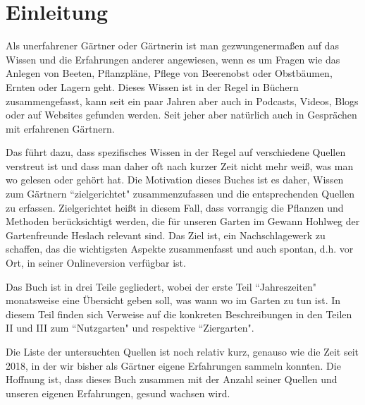 \section{Einleitung}

Als unerfahrener Gärtner oder Gärtnerin ist man gezwungenermaßen auf das Wissen und die Erfahrungen anderer angewiesen, wenn es um Fragen wie das Anlegen von Beeten, Pflanzpläne, Pflege von Beerenobst oder Obstbäumen, Ernten oder Lagern geht.
Dieses Wissen ist in der Regel in Büchern zusammengefasst, kann seit ein paar Jahren aber auch in Podcasts, Videos, Blogs oder auf Websites gefunden werden.
Seit jeher aber natürlich auch in Gesprächen mit erfahrenen Gärtnern.

Das führt dazu, dass spezifisches Wissen in der Regel auf verschiedene Quellen verstreut ist und dass man daher oft nach kurzer Zeit nicht mehr weiß, was man wo gelesen oder gehört hat.
Die Motivation dieses Buches ist es daher, Wissen zum Gärtnern ``zielgerichtet" zusammenzufassen und die entsprechenden Quellen zu erfassen.
Zielgerichtet heißt in diesem Fall, dass vorrangig die Pflanzen und Methoden berücksichtigt werden, die für unseren Garten im Gewann Hohlweg der Gartenfreunde Heslach relevant sind.
Das Ziel ist, ein Nachschlagewerk zu schaffen, das die wichtigsten Aspekte zusammenfasst und auch spontan, d.h. vor Ort, in seiner Onlineversion verfügbar ist.

Das Buch ist in drei Teile gegliedert, wobei der erste Teil ``Jahreszeiten" monatsweise eine Übersicht geben soll, was wann wo im Garten zu tun ist.
In diesem Teil finden sich Verweise auf die konkreten Beschreibungen in den Teilen II und III zum ``Nutzgarten" und respektive ``Ziergarten".

Die Liste der untersuchten Quellen ist noch relativ kurz, genauso wie die Zeit seit 2018, in der wir bisher als Gärtner eigene Erfahrungen sammeln konnten.
Die Hoffnung ist, dass dieses Buch zusammen mit der Anzahl seiner Quellen und unseren eigenen Erfahrungen, gesund wachsen wird.

